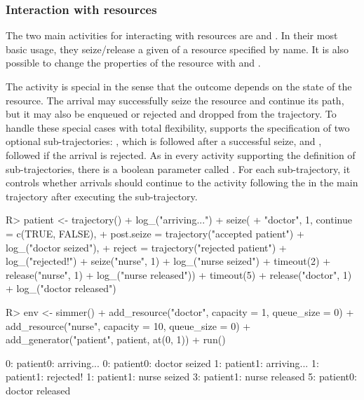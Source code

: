 \documentclass[
  nojss]{jss}
\begin{document}
\hypertarget{interaction-with-resources}{%
\subsubsection{Interaction with
resources}\label{interaction-with-resources}}

The two main activities for interacting with resources are
 and . In their most basic usage, they
seize/release a given  of a resource specified by name. It
is also possible to change the properties of the resource with
 and .

The  activity is special in the sense that the outcome
depends on the state of the resource. The arrival may successfully seize
the resource and continue its path, but it may also be enqueued or
rejected and dropped from the trajectory. To handle these special cases
with total flexibility,  supports the specification of two
optional sub-trajectories: , which is followed after a
successful seize, and , followed if the arrival is
rejected. As in every activity supporting the definition of
sub-trajectories, there is a boolean parameter called .
For each sub-trajectory, it controls whether arrivals should continue to
the activity following the  in the main trajectory after
executing the sub-trajectory.

\begin{CodeChunk}
\begin{CodeInput}
R> patient <- trajectory() %
+   log_("arriving...") %
+   seize(
+     "doctor", 1, continue = c(TRUE, FALSE),
+     post.seize = trajectory("accepted patient") %
+       log_("doctor seized"),
+     reject = trajectory("rejected patient") %
+       log_("rejected!") %
+       seize("nurse", 1) %
+       log_("nurse seized") %
+       timeout(2) %
+       release("nurse", 1) %
+       log_("nurse released")) %
+   timeout(5) %
+   release("doctor", 1) %
+   log_("doctor released")
\end{CodeInput}
\end{CodeChunk}

\begin{CodeChunk}
\begin{CodeInput}
R> env <- simmer() %
+   add_resource("doctor", capacity = 1, queue_size = 0) %
+   add_resource("nurse", capacity = 10, queue_size = 0) %
+   add_generator("patient", patient, at(0, 1)) %
+   run()
\end{CodeInput}
\begin{CodeOutput}
0: patient0: arriving...
0: patient0: doctor seized
1: patient1: arriving...
1: patient1: rejected!
1: patient1: nurse seized
3: patient1: nurse released
5: patient0: doctor released
\end{CodeOutput}
\end{CodeChunk}
\end{document}
